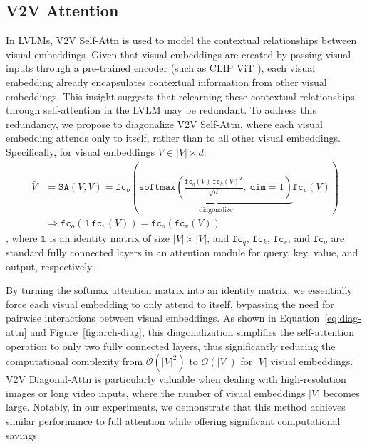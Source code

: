 

\subsection{V2V Attention}\label{sec:v2v-attn}

In LVLMs, V2V Self-Attn is used to model the contextual relationships between visual embeddings.
Given that visual embeddings are created by passing visual inputs through a pre-trained encoder (such as CLIP ViT \citep{vit}), each visual embedding already encapsulates contextual information from other visual embeddings.
This insight suggests that relearning these contextual relationships through self-attention in the LVLM may be redundant.
To address this redundancy, we propose to diagonalize V2V Self-Attn, where each visual embedding attends only to itself, rather than to all other visual embeddings.
Specifically, for visual embeddings $V \in |V|\times d$:
\begin{align}
\bar{V} &= \texttt{SA}(V, V) = \texttt{fc}_o\left( \underbrace{\texttt{softmax}\left( \frac{\texttt{fc}_q(V)\ \texttt{fc}_k(V)^T}{\sqrt{d}},\ \texttt{dim}=1\right)}_{\text{diagonalize} }\texttt{fc}_v(V) \right)\\
&\Rightarrow \texttt{fc}_o\left(\mathds{1}\ \texttt{fc}_v(V) \right) =  \texttt{fc}_o\left(\texttt{fc}_v(V) \right)\label{eq:diag-attn}
\end{align}
, where $\mathds{1}$ is an identity matrix of size $|V|\times |V|$, and $\texttt{fc}_q$, $\texttt{fc}_k$, $\texttt{fc}_v$, and $\texttt{fc}_o$ are standard fully connected layers in an attention module for query, key, value, and output, respectively.

By turning the softmax attention matrix into an identity matrix, we essentially force each visual embedding to only attend to itself, bypassing the need for pairwise interactions between visual embeddings.
As shown in Equation~\ref{eq:diag-attn} and Figure~\ref{fig:arch-diag}, this diagonalization simplifies the self-attention operation to only two fully connected layers, thus significantly reducing the computational complexity from $\mathcal{O}(|V|^2)$ to $\mathcal{O}(|V|)$ for $|V|$ visual embeddings.
V2V Diagonal-Attn is particularly valuable when dealing with high-resolution images or long video inputs, where the number of visual embeddings $|V|$ becomes large. 
Notably, in our experiments, we demonstrate that this method achieves similar performance to full attention while offering significant computational savings.

